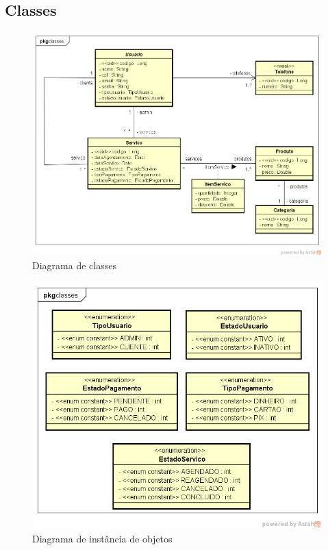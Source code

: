 \subsection{Classes}
\begin{figure}[H]
	\centering
	\includegraphics[width=1\linewidth]{imagens/classes}
	\caption[Diagrama de classes]{Diagrama de classes}
	\label{fig:fig2}
\end{figure}
\begin{figure}[H]
	\centering
	\includegraphics[width=1\linewidth]{imagens/enums}
	\caption[Diagrama de objetos]{Diagrama de instância de objetos}
	\label{fig:fig3}
\end{figure}
